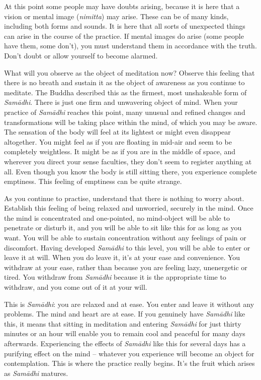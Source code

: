 At this point some people may have doubts arising, because it is here that a vision or mental image (\textit{nimitta}) may arise. These can be of many kinds, including both forms and sounds. It is here that all sorts of unexpected things can arise in the course of the practice. If mental images do arise (some people have them, some don't), you must understand them in accordance with the truth. Don't doubt or allow yourself to become alarmed.

What will you observe as the object of meditation now? Observe this feeling that there is no breath and sustain it as the object of awareness as you continue to meditate. The Buddha described this as the firmest, most unshakeable form of \textit{Sam\=adhi}. There is just one firm and unwavering object of mind. When your practice of \textit{Sam\=adhi} reaches this point, many unusual and refined changes and transformations will be taking place within the mind, of which you may be aware. The sensation of the body will feel at its lightest or might even disappear altogether. You might feel as if you are floating in mid-air and seem to be completely weightless. It might be as if you are in the middle of space, and wherever you direct your sense faculties, they don't seem to register anything at all. Even though you know the body is still sitting there, you experience complete emptiness. This feeling of emptiness can be quite strange.

As you continue to practise, understand that there is nothing to worry about. Establish this feeling of being relaxed and unworried, securely in the mind. Once the mind is concentrated and one-pointed, no mind-object will be able to penetrate or disturb it, and you will be able to sit like this for as long as you want. You will be able to sustain concentration without any feelings of pain or discomfort. Having developed \textit{Sam\=adhi} to this level, you will be able to enter or leave it at will. When you do leave it, it's at your ease and convenience. You withdraw at your ease, rather than because you are feeling lazy, unenergetic or tired. You withdraw from \textit{Sam\=adhi} because it is the appropriate time to withdraw, and you come out of it at your will.

This is \textit{Sam\=adhi}: you are relaxed and at ease. You enter and leave it without any problems. The mind and heart are at ease. If you genuinely have \textit{Sam\=adhi} like this, it means that sitting in meditation and entering \textit{Sam\=adhi} for just thirty minutes or an hour will enable you to remain cool and peaceful for many days afterwards. Experiencing the effects of \textit{Sam\=adhi} like this for several days has a purifying effect on the mind -- whatever you experience will become an object for contemplation. This is where the practice really begins. It's the fruit which arises as \textit{Sam\=adhi} matures.

